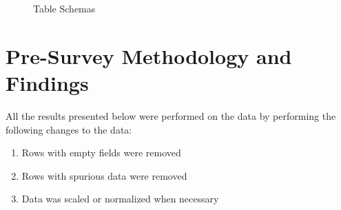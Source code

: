 %

\begin{figure}[htp]
\hspace{1em}
\caption{Table Schemas}
\label{fig:s3}
\end{figure}


\section{Pre-Survey Methodology and Findings}
All the results presented below were performed on the data by performing the following changes to the data:
\begin{enumerate}
\item Rows with empty fields were removed
\item Rows with spurious data were removed
\item Data was scaled or normalized when necessary
\end{enumerate}


